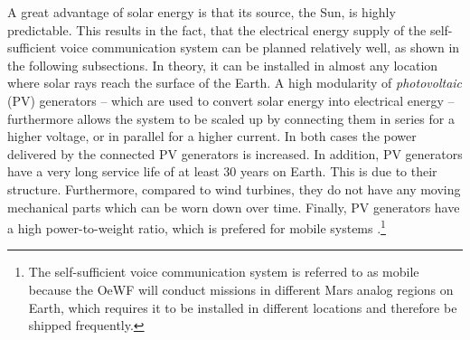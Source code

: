 A great advantage of solar energy is that its source, the Sun, is highly predictable. This results in the fact, that the electrical energy supply of the self-sufficient voice communication system can be planned relatively well, as shown in the following subsections. In theory, it can be installed in almost any location where solar rays reach the surface of the Earth. A high modularity of \emph{photovoltaic} (PV) generators -- which are used to convert solar energy into electrical energy -- furthermore allows the system to be scaled up by connecting them in series for a higher voltage, or in parallel for a higher current. In both cases the power delivered by the connected PV generators is increased. In addition, PV generators have a very long service life of at least 30 years on Earth. This is due to their structure. Furthermore, compared to wind turbines, they do not have any moving mechanical parts which can be worn down over time. Finally, PV generators have a high power-to-weight ratio, which is prefered for mobile systems \cite{Landis:1995, Rebhan:2002, Mertens:2015}.\footnote{The self-sufficient voice communication system is referred to as mobile because the OeWF will conduct missions in different Mars analog regions on Earth, which requires it to be installed in different locations and therefore be shipped frequently.}


